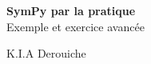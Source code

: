 \documentclass[11pt,fleqn]{book} %
\begin{document}

\begingroup
\thispagestyle{empty}
\centering
\vspace*{5cm}
\par\normalfont\fontsize{35}{35}\sffamily\selectfont
\textbf{SymPy par la pratique}\\
{\LARGE Exemple et exercice avancée}\par %
\vspace*{1cm}
{\Huge K.I.A Derouiche}\par %
\endgroup


\newpage
~\vfill
\thispagestyle{empty}



\pagestyle{empty} %

\tableofcontents %


\pagestyle{fancy} %






\end{document}
